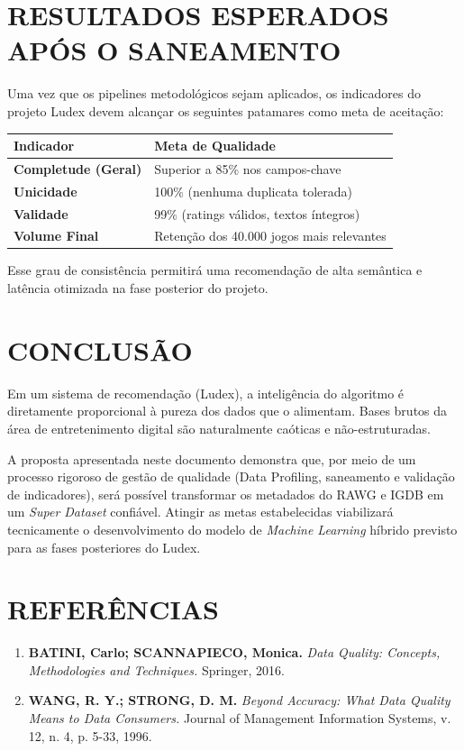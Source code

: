 \documentclass[12pt,a4paper]{article}
\begin{document}
\section{RESULTADOS ESPERADOS APÓS O SANEAMENTO}
Uma vez que os pipelines metodológicos sejam aplicados, os indicadores do projeto Ludex devem alcançar os seguintes patamares como meta de aceitação:

\vspace{0.5cm}
\begin{center}
\begin{tabular}{ll}
\hline
\textbf{Indicador} & \textbf{Meta de Qualidade} \\
\hline
\textbf{Completude (Geral)} & Superior a 85\% nos campos-chave \\
\textbf{Unicidade} & 100\% (nenhuma duplicata tolerada) \\
\textbf{Validade} & 99\% (ratings válidos, textos íntegros) \\
\textbf{Volume Final} & Retenção dos 40.000 jogos mais relevantes \\
\hline
\end{tabular}
\end{center}
\vspace{0.5cm}

Esse grau de consistência permitirá uma recomendação de alta semântica e latência otimizada na fase posterior do projeto.

\section{CONCLUSÃO}
Em um sistema de recomendação (Ludex), a inteligência do algoritmo é diretamente proporcional à pureza dos dados que o alimentam. Bases brutos da área de entretenimento digital são naturalmente caóticas e não-estruturadas. 

A proposta apresentada neste documento demonstra que, por meio de um processo rigoroso de gestão de qualidade (Data Profiling, saneamento e validação de indicadores), será possível transformar os metadados do RAWG e IGDB em um \textit{Super Dataset} confiável. Atingir as metas estabelecidas viabilizará tecnicamente o desenvolvimento do modelo de \textit{Machine Learning} híbrido previsto para as fases posteriores do Ludex.

\section*{REFERÊNCIAS}
\begin{enumerate}
    \item \textbf{BATINI, Carlo; SCANNAPIECO, Monica.} \textit{Data Quality: Concepts, Methodologies and Techniques.} Springer, 2016.
    \item \textbf{WANG, R. Y.; STRONG, D. M.} \textit{Beyond Accuracy: What Data Quality Means to Data Consumers.} Journal of Management Information Systems, v. 12, n. 4, p. 5-33, 1996.
\end{enumerate}
\end{document}
